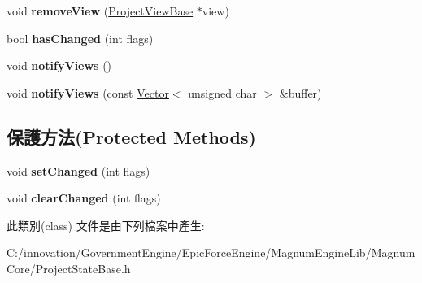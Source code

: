 \begin{DoxyCompactItemize}
\item 
void {\bfseries remove\+View} (\hyperlink{classi_dream_sky_1_1_project_view_base}{Project\+View\+Base} $\ast$view)\hypertarget{classi_dream_sky_1_1_project_model_base_a928f1792e1b9ad1beb1bf9688c230cfb}{}\label{classi_dream_sky_1_1_project_model_base_a928f1792e1b9ad1beb1bf9688c230cfb}

\item 
bool {\bfseries has\+Changed} (int flags)\hypertarget{classi_dream_sky_1_1_project_model_base_a30d5690dfd04557692ab304283fe806a}{}\label{classi_dream_sky_1_1_project_model_base_a30d5690dfd04557692ab304283fe806a}

\item 
void {\bfseries notify\+Views} ()\hypertarget{classi_dream_sky_1_1_project_model_base_a2fe3c62dfa939c12a9ab65ffbade6306}{}\label{classi_dream_sky_1_1_project_model_base_a2fe3c62dfa939c12a9ab65ffbade6306}

\item 
void {\bfseries notify\+Views} (const \hyperlink{class_i_dream_sky_1_1_vector}{Vector}$<$ unsigned char $>$ \&buffer)\hypertarget{classi_dream_sky_1_1_project_model_base_a5839f8dcbe8521e685cb6f98bb14df6d}{}\label{classi_dream_sky_1_1_project_model_base_a5839f8dcbe8521e685cb6f98bb14df6d}

\end{DoxyCompactItemize}
\subsection*{保護方法(Protected Methods)}
\begin{DoxyCompactItemize}
\item 
void {\bfseries set\+Changed} (int flags)\hypertarget{classi_dream_sky_1_1_project_model_base_a159df53241ed6981bf18a641160cdfaf}{}\label{classi_dream_sky_1_1_project_model_base_a159df53241ed6981bf18a641160cdfaf}

\item 
void {\bfseries clear\+Changed} (int flags)\hypertarget{classi_dream_sky_1_1_project_model_base_a6a036afc0cd3641848d92536de548e9d}{}\label{classi_dream_sky_1_1_project_model_base_a6a036afc0cd3641848d92536de548e9d}

\end{DoxyCompactItemize}


此類別(class) 文件是由下列檔案中產生\+:\begin{DoxyCompactItemize}
\item 
C\+:/innovation/\+Government\+Engine/\+Epic\+Force\+Engine/\+Magnum\+Engine\+Lib/\+Magnum\+Core/Project\+State\+Base.\+h\end{DoxyCompactItemize}
